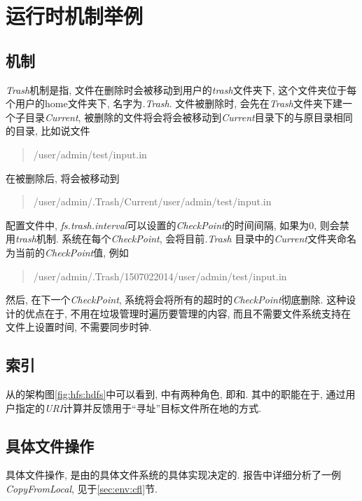 \section{运行时机制举例}
\label{sec:hfs:rtm}

\subsection{{\Trash}机制}
\label{ssec:hfs:trashing}

\def\Trash{\emph{Trash}}
\def\trash{\emph{trash}}


{\Trash}机制是指, 文件在删除时会被移动到用户的{\trash}文件夹下,
这个文件夹位于每个用户的home文件夹下, 名字为\emph{.Trash}.
文件被删除时, 会先在{\Trash}文件夹下建一个子目录\emph{Current},
被删除的文件将会将会被移动到\emph{Current}目录下的与原目录相同的目录,
比如说文件
\begin{quote}
    /user/admin/test/input.in
\end{quote}
在被删除后, 将会被移动到
\begin{quote}
    /user/admin/.Trash/Current/user/admin/test/input.in
\end{quote}
配置文件中, \emph{fs.trash.interval}可以设置的\emph{CheckPoint}的时间间隔,
如果为0, 则会禁用{\trash}机制. 系统在每个\emph{CheckPoint}, 会将目前\emph{.Trash}
目录中的\emph{Current}文件夹命名为当前的\emph{CheckPoint}值, 例如
\begin{quote}
    /user/admin/.Trash/1507022014/user/admin/test/input.in
\end{quote}
然后, 在下一个\emph{CheckPoint}, 系统将会将所有的超时的\emph{CheckPoint}彻底删除.
这种设计的优点在于, 不用在垃圾管理时遍历要管理的内容,
而且不需要文件系统支持在文件上设置时间, 不需要同步时钟.

\subsection{索引}
\label{ssec:hfs:addressing}

从{\HDFS}的架构图\ref{fig:hfs:hdfs}中可以看到, {\HDFS}中有两种角色, 即{\NameN}和{\DataN}.
其中{\DataN}的职能在于, 通过用户指定的\emph{URI}计算并反馈用于``寻址''目标文件所在地的方式.

\subsection{具体文件操作}

具体文件操作, 是由的具体文件系统的具体实现决定的.
报告中详细分析了一例\emph{CopyFromLocal}, 见于\ref{sec:env:cfl}节.
